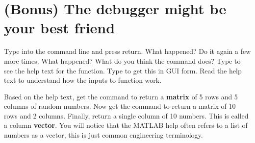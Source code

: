 \documentclass{article}
\begin{document}
\section{(Bonus) The debugger might be your best friend}



\pagebreak


Type  into the command line and press return. What happened?
Do it again a few more times. What happened?
What do you think the  command does?
Type  to see the help text for the  function.
Type  to get this in GUI form.
Read the help text to understand how the inputs to function work. 

Based on the help text, get the  command to return a \textbf{matrix} of 5 rows and 5 columns of random numbers. Now get the  command to return a matrix of 10 rows and 2 columns. Finally, return a single column of 10 numbers. This is called a column \textbf{vector}. You will notice that the MATLAB help often refers to a list of numbers as a vector, this is just common engineering terminology. 
\end{document}
